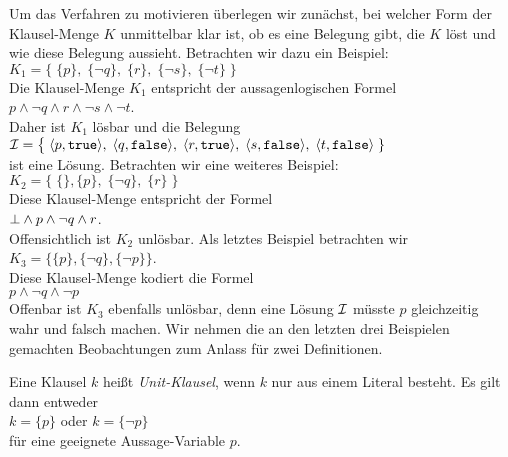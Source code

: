Um das Verfahren zu motivieren \"{u}berlegen wir zun\"{a}chst, bei welcher Form der Klausel-Menge $K$
unmittelbar klar ist, ob es eine Belegung gibt, die $K$ l\"{o}st und wie diese Belegung
aussieht.  Betrachten wir dazu ein Beispiel: \\[0.2cm]
\hspace*{1.3cm} 
$K_1 = \bigl\{\; \{p\},\; \{\neg q\},\; \{r\},\; \{\neg s\}, \; \{\neg t\} \;\bigr\}$ 
\\[0.2cm]
Die Klausel-Menge $K_1$ entspricht der aussagenlogischen Formel
\\[0.2cm]
\hspace*{1.3cm}
$p \wedge \neg q \wedge r \wedge \neg s \wedge \neg t$.
\\[0.2cm]
Daher ist $K_1$ l\"{o}sbar und die Belegung  \\[0.2cm]
\hspace*{1.3cm} 
$\I = \bigl\{\; \pair(p, \texttt{true}),\; \pair(q, \texttt{false}),\;\pair(r, \texttt{true}),\; \pair(s, \texttt{false}),\; \pair(t, \texttt{false})\;\}$
\\[0.2cm]
ist eine L\"{o}sung.  Betrachten wir eine weiteres Beispiel: \\[0.2cm]
\hspace*{1.3cm} 
$K_2 = \bigl\{\; \{\}, \{p\},\; \{\neg q\},\; \{r\}\; \bigr\}$ 
\\[0.2cm]
Diese Klausel-Menge entspricht der Formel
\\[0.2cm]
\hspace*{1.3cm}
$\bot \wedge p \wedge \neg q \wedge r$.
\\[0.2cm]
Offensichtlich ist $K_2$ unl\"{o}sbar.  Als letztes Beispiel betrachten wir 
\\[0.2cm]
\hspace*{1.3cm} $K_3 = \bigl\{ \{p\}, \{\neg q\}, \{\neg p\} \bigr\}$.
\\[0.2cm]
Diese Klausel-Menge kodiert die Formel
\\[0.2cm]
\hspace*{1.3cm}
$p \wedge \neg q \wedge \neg p $
\\[0.2cm]
Offenbar ist $K_3$ ebenfalls unl\"{o}sbar, denn eine L\"{o}sung $\mathcal{I}$ m\"{u}sste $p$ gleichzeitig
wahr und falsch machen.
Wir nehmen die an den letzten drei Beispielen gemachten Beobachtungen zum Anlass f\"{u}r zwei Definitionen.

\begin{Definition}
  Eine Klausel $k$ hei\ss{}t \emph{\color{blue}Unit-Klausel}, wenn $k$ nur aus einem Literal besteht.
  Es gilt dann entweder
  \\[0.2cm]
  \hspace*{1.3cm}
  $k = \{p\}$ \quad oder \quad $k = \{\neg p\}$ 
  \\[0.2cm]
  f\"{u}r eine geeignete Aussage-Variable $p$. \eox
\end{Definition}

